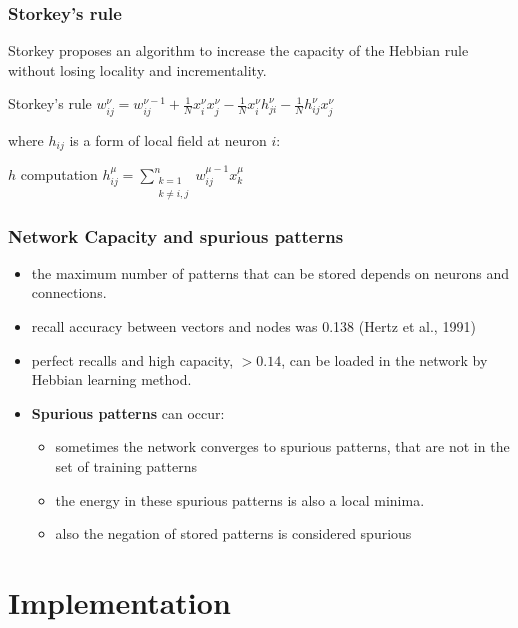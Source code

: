 \documentclass{beamer}
\begin{document}

\begin{frame}
\frametitle{Storkey's rule}
Storkey proposes an algorithm to increase the capacity of the Hebbian rule without losing locality and incrementality.
\begin{block}{Storkey's rule}
$w_{ij}^{\nu} = w_{ij}^{\nu-1}+ \frac{1}{N} x_i^{\nu}x_j^{\nu} - \frac{1}{N} x_i^{\nu}h_{ji}^{\nu} - \frac{1}{N} h_{ij}^{\nu}x_j^{\nu}$
\end{block}
where $h_{ij}$ is a form of local field at neuron $i$:
\begin{block}{$h$ computation}
$h_{ij}^{\mu} = \sum_{\substack{k=1\\k\neq i,j}}^n w_{ij}^{\mu-1} x_k^{\mu}$
\end{block}
\end{frame}


\begin{frame}
\frametitle{Network Capacity and spurious patterns}
\begin{itemize}
\item the maximum number of patterns that can be stored depends on neurons and connections.
\item recall accuracy between vectors and nodes was 0.138 (Hertz et al., 1991)
\item perfect recalls and high capacity, $>0.14$, can be loaded in the network by Hebbian learning method.
\item\textbf{Spurious patterns} can occur: \begin{itemize}
\item sometimes the network converges to spurious patterns, that are not in the set of training patterns
\item the energy in these spurious patterns is also a local minima. 
\item also the negation of stored patterns is considered spurious
\end{itemize}
\end{itemize}
\end{frame}





\section{Implementation}
\end{document}

